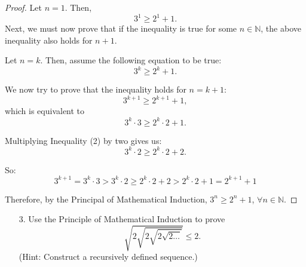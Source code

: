 \documentclass[10pt]{article}
\theoremstyle{definition}
\theoremstyle{plain}
\newcommand{\N}{\mathbb{N}}
\begin{document}
\begin{proof}
  Let $n=1$. Then,
  \begin{equation}
    3^1 \geq 2^1 + 1.
  \end{equation}
  Next, we must now prove that if the inequality is true for some $n\in\N$, the above inequality also holds for $n+1$.

  \par Let $n=k$. Then, assume the following equation to be true:
  \begin{equation}
    3^k \geq 2^k + 1.
  \end{equation}

  \par We now try to prove that the inequality holds for $n=k+1$:
  \begin{equation}
    3^{k+1} \geq 2^{k+1} + 1,
  \end{equation}
  which is equivalent to
  \begin{equation}
    3^{k}\cdot 3 \geq 2^{k}\cdot 2 + 1.
  \end{equation}

  \par Multiplying Inequality (2) by two gives us:
  \begin{equation}
    3^{k}\cdot 2 \geq 2^{k}\cdot 2 + 2.
  \end{equation}

  \par So:
    $$3^{k+1}=3^{k}\cdot 3 > 3^{k}\cdot 2 \geq 2^{k}\cdot 2 + 2 > 2^{k}\cdot 2 + 1 = 2^{k+1}+1$$

  \par Therefore, by the Principal of Mathematical Induction, $3^n \geq 2^n + 1$, $\forall n\in\N$.
\end{proof}



\pagebreak



\begin{enumerate}
  \item[3.] Use the Principle of Mathematical Induction to prove
  $$\sqrt{2\sqrt{2\sqrt{2\sqrt{2\dots}}}} \leq 2.$$
  (Hint:  Construct a recursively defined sequence.)
\end{enumerate}
\end{document}
